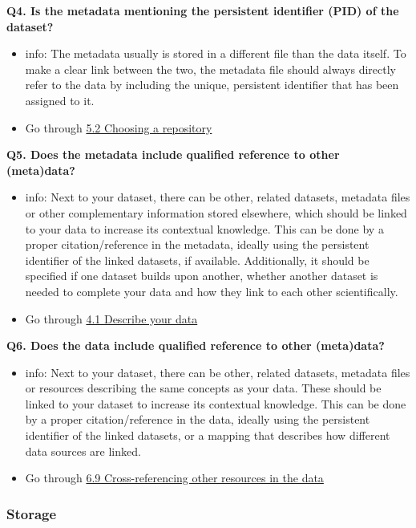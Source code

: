 \documentclass[
  oneside]{book}
\providecommand{\tightlist}{%
  \setlength{\itemsep}{0pt}\setlength{\parskip}{0pt}}
\begin{document}
\textbf{Q4. Is the metadata mentioning the persistent identifier (PID) of the dataset?}

\begin{itemize}
\tightlist
\item
  info: The metadata usually is stored in a different file than the data itself. To make a clear link between the two, the metadata file should always directly refer to the data by including the unique, persistent identifier that has been assigned to it.
\item
  Go through \hyperref[choosing-a-repository]{5.2 Choosing a repository}
\end{itemize}

\textbf{Q5. Does the metadata include qualified reference to other (meta)data?}

\begin{itemize}
\tightlist
\item
  info: Next to your dataset, there can be other, related datasets, metadata files or other complementary information stored elsewhere, which should be linked to your data to increase its contextual knowledge. This can be done by a proper citation/reference in the metadata, ideally using the persistent identifier of the linked datasets, if available. Additionally, it should be specified if one dataset builds upon another, whether another dataset is needed to complete your data and how they link to each other scientifically.
\item
  Go through \hyperref[describe-data]{4.1 Describe your data}
\end{itemize}

\textbf{Q6. Does the data include qualified reference to other (meta)data?}

\begin{itemize}
\tightlist
\item
  info: Next to your dataset, there can be other, related datasets, metadata files or resources describing the same concepts as your data. These should be linked to your dataset to increase its contextual knowledge. This can be done by a proper citation/reference in the data, ideally using the persistent identifier of the linked datasets, or a mapping that describes how different data sources are linked.
\item
  Go through \hyperref[crossref-in-data]{6.9 Cross-referencing other resources in the data}
\end{itemize}

\subsubsection*{Storage}\label{storage}
\end{document}
